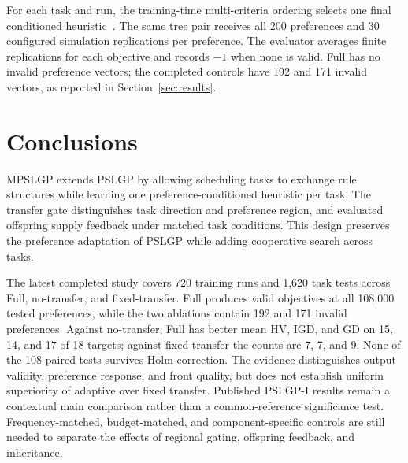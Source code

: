 \documentclass[10pt,journal]{IEEEtran}
\newcommand{\resultrevision}[1]{\textcolor{resultrevision}{#1}}
\begin{document}
\resultrevision{For each task and run, the training-time multi-criteria ordering selects one final conditioned heuristic~\cite{xu2026pslgp}. The same tree pair receives all 200 preferences and 30 configured simulation replications per preference. The evaluator averages finite replications for each objective and records $-1$ when none is valid. Full has no invalid preference vectors; the completed controls have 192 and 171 invalid vectors, as reported in Section~\ref{sec:results}.}


\FloatBarrier

\FloatBarrier

\section{Conclusions}
\label{sec:conclusions}
\resultrevision{MPSLGP extends PSLGP by allowing scheduling tasks to exchange rule structures while learning one preference-conditioned heuristic per task. The transfer gate distinguishes task direction and preference region, and evaluated offspring supply feedback under matched task conditions. This design preserves the preference adaptation of PSLGP while adding cooperative search across tasks.}

\resultrevision{The latest completed study covers 720 training runs and 1,620 task tests across Full, no-transfer, and fixed-transfer. Full produces valid objectives at all 108,000 tested preferences, while the two ablations contain 192 and 171 invalid preferences. Against no-transfer, Full has better mean HV, IGD, and GD on 15, 14, and 17 of 18 targets; against fixed-transfer the counts are 7, 7, and 9. None of the 108 paired tests survives Holm correction. The evidence distinguishes output validity, preference response, and front quality, but does not establish uniform superiority of adaptive over fixed transfer. Published PSLGP-I results remain a contextual main comparison rather than a common-reference significance test. Frequency-matched, budget-matched, and component-specific controls are still needed to separate the effects of regional gating, offspring feedback, and inheritance.}



\end{document}
